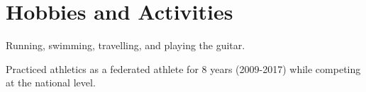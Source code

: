 \documentclass[a4paper,12pt]{article}
\begin{document}
\section{Hobbies and Activities}

\begin{description}[font=$\circ$]
\itemsep-2pt
\item {Running, swimming, travelling, and playing the guitar.}
\item {Practiced athletics as a federated athlete for 8 years (2009-2017) while competing at the national level.}
\end{description}
\end{document}
